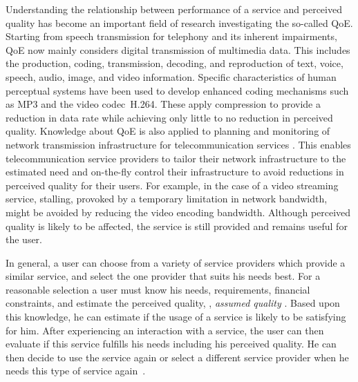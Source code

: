 Understanding the relationship between performance of a service and perceived quality has become an important field of research investigating the so-called \ac{QoE}.
Starting from speech transmission for telephony \citep[][]{ieee_audio_and_electroacoustics_group_ieee_1969} and its inherent impairments, \ac{QoE} now mainly considers digital transmission of multimedia data. %
This includes the production, coding, transmission, decoding, and reproduction of text, voice, speech, audio, image, and video information.
Specific characteristics of human perceptual systems have been used to develop enhanced coding mechanisms such as \ac{MP3} and the video codec~H.264.
These apply compression to provide a reduction in data rate while achieving only little to no reduction in perceived quality.
Knowledge about \ac{QoE} is also applied to planning and monitoring of network transmission infrastructure for telecommunication services \citep[][]{schatz_qoe-based_2014}.
This enables telecommunication service providers to tailor their network infrastructure to the estimated need and on-the-fly control their infrastructure to avoid reductions in perceived quality for their users.
For example, in the case of a video streaming service, stalling, provoked by a temporary limitation in network bandwidth, might be avoided by reducing the video encoding bandwidth.
Although perceived quality is likely to be affected, the service is still provided and remains useful for the user.

In general, a user can choose from a variety of service providers which provide a similar service, and select the one provider that suits his needs best.
For a reasonable selection a user must know his needs, requirements, financial constraints, and estimate the perceived quality, \ie, \emph{assumed quality} \citep[][p.~13]{raake_quality_2014}.
Based upon this knowledge, he can estimate if the usage of a service is likely to be satisfying for him.
After experiencing an interaction with a service, the user can then evaluate if this service fulfills his needs including his perceived quality.
He can then decide to use the service again or select a different service provider when he needs this type of service again~\citep[][]{geerts_linking_2010}.

